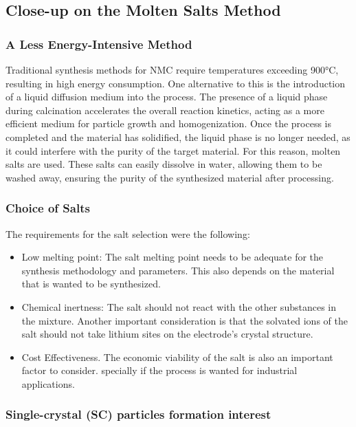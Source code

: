 \documentclass{article}
\begin{document}
\subsection{Close-up on the Molten Salts Method}

\subsubsection{A Less Energy-Intensive Method}
Traditional synthesis methods for NMC require temperatures exceeding 900°C, resulting in high energy consumption. One alternative to this is the introduction of a liquid diffusion medium into the process. The presence of a liquid phase during calcination accelerates the overall reaction kinetics, acting as a more efficient medium for particle growth and homogenization. Once the process is completed and the material has solidified, the liquid phase is no longer needed, as it could interfere with the purity of the target material. For this reason, molten salts are used. These salts can easily dissolve in water, allowing them to be washed away, ensuring the purity of the synthesized material after processing.\cite{Heuristics}

\subsubsection{Choice of Salts}
The requirements for the salt selection were the following:
\begin {itemize}
\item Low melting point: The salt melting point needs to be adequate 
for the synthesis methodology and parameters. This also depends on the material
that is wanted to be synthesized.
\item Chemical inertness: The salt should not react with the other substances in the mixture. 
Another important consideration is that the solvated ions of the salt should not take lithium sites on 
the electrode's crystal structure.
\item Cost Effectiveness. The economic viability of the salt is also an important factor to consider.
specially if the process is wanted for industrial applications. 
\end{itemize}

\subsubsection{Single-crystal (SC) particles formation interest}
\end{document}
